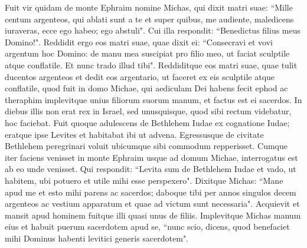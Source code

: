 \begin{biblechapter}  
\verse Fuit vir quidam de monte Ephraim nomine Michas, 
\verse qui dixit matri suae: “Mille centum argenteos, qui ablati sunt a te et super quibus, me audiente, maledicens iuraveras, ecce ego habeo; ego abstuli". Cui illa respondit: “Benedictus filius meus Domino!". 
\verse Reddidit ergo eos matri suae, quae dixit ei: “Consecravi et vovi argentum hoc Domino: de manu mea suscipiat pro filio meo, ut faciat sculptile atque conflatile. Et nunc trado illud tibi". 
\verse Reddiditque eos matri suae, quae tulit ducentos argenteos et dedit eos argentario, ut faceret ex eis sculptile atque conflatile, quod fuit in domo Michae, 
\verse qui aediculam Dei habens fecit ephod ac theraphim implevitque unius filiorum suorum manum, et factus est ei sacerdos. 
\verse In diebus illis non erat rex in Israel, sed unusquisque, quod sibi rectum videbatur, hoc faciebat. 
\verse Fuit quoque adulescens de Bethlehem Iudae ex cognatione Iudae; eratque ipse Levites et habitabat ibi ut advena. 
\verse Egressusque de civitate Bethlehem peregrinari voluit ubicumque sibi commodum repperisset. Cumque iter faciens venisset in monte Ephraim usque ad domum Michae, 
\verse interrogatus est ab eo unde venisset. Qui respondit: “Levita sum de Bethlehem Iudae et vado, ut habitem, ubi potuero et utile mihi esse perspexero". 
\verse Dixitque Michas: “Mane apud me et esto mihi parens ac sacerdos; daboque tibi per annos singulos decem argenteos ac vestium apparatum et quae ad victum sunt necessaria". 
\verse Acquievit et mansit apud hominem fuitque illi quasi unus de filiis. 
\verse Implevitque Michas manum eius et habuit puerum sacerdotem apud se, 
\verse “nunc scio, dicens, quod benefaciet mihi Dominus habenti levitici generis sacerdotem". 
\end{biblechapter}

